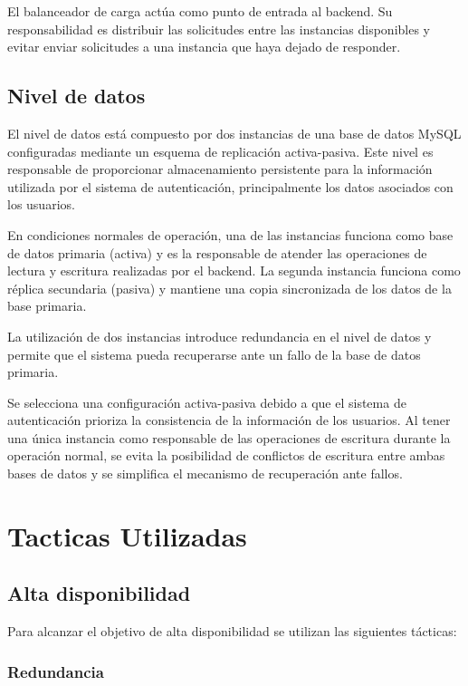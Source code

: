 \documentclass[12pt,a4paper]{article}
\begin{document}
El balanceador de carga actúa como punto de entrada al backend. Su
responsabilidad es distribuir las solicitudes entre las instancias
disponibles y evitar enviar solicitudes a una instancia que haya
dejado de responder.

\subsection{Nivel de datos}

El nivel de datos está compuesto por dos instancias de una base de
datos MySQL configuradas mediante un esquema de replicación
activa-pasiva. Este nivel es responsable de proporcionar
almacenamiento persistente para la información utilizada por el
sistema de autenticación, principalmente los datos asociados con los usuarios.

En condiciones normales de operación, una de las instancias funciona
como base de datos primaria (activa) y es la responsable de atender
las operaciones de lectura y escritura realizadas por el backend. La
segunda instancia funciona como réplica secundaria (pasiva) y
mantiene una copia sincronizada de los datos de la base primaria.

La utilización de dos instancias introduce redundancia en el nivel de
datos y permite que el sistema pueda recuperarse ante un fallo de la
base de datos primaria.

Se selecciona una configuración activa-pasiva debido a que el sistema
de autenticación prioriza la consistencia de la información de los
usuarios. Al tener una única instancia como responsable de las
operaciones de escritura durante la operación normal, se evita la
posibilidad de conflictos de escritura entre ambas bases de datos y
se simplifica el mecanismo de recuperación ante fallos.

\section{Tacticas Utilizadas}

\subsection{Alta disponibilidad}

Para alcanzar el objetivo de alta disponibilidad se utilizan las
siguientes tácticas:

\subsubsection{Redundancia}
\end{document}
